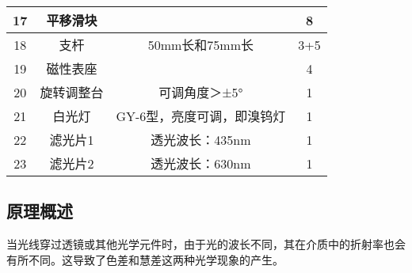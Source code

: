 \documentclass[dvipsnames, svgnames,a4paper,11pt]{article}
\begin{document}
\begin{table}[htbp]
\begin{tabular}{|c|c|c|c|}
			17               & 平移滑块           &                      & 8            \\ \hline
			18               & 支杆               & 50mm长和75mm长       & 3+5          \\ \hline
			19               & 磁性表座           &                      & 4            \\ \hline
			20               & 旋转调整台         & 可调角度＞±5°        & 1            \\ \hline
			21               & 白光灯             & GY-6型，亮度可调，即溴钨灯 & 1     \\ \hline
			22               & 滤光片1            & 透光波长：435nm       & 1            \\ \hline
			23               & 滤光片2            & 透光波长：630nm       & 1            \\ \hline
			\end{tabular}
			\end{table}
			
	
	\subsection{原理概述}
	
当光线穿过透镜或其他光学元件时，由于光的波长不同，其在介质中的折射率也会有所不同。这导致了色差和慧差这两种光学现象的产生。
\end{document}
